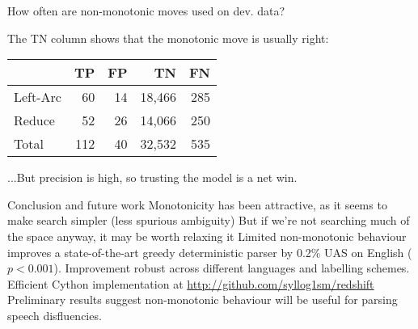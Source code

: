 \documentclass{lecture}
\begin{document}
\begin{plain}{How often are non-monotonic moves used on dev. data?}

The TN column shows that the monotonic move is usually right:

\begin{table}
    \centering
    \small
    \begin{tabular}{l|rrrr}
\hline
         & TP  &  FP & TN     & FN \\
\hline \hline
Left-Arc & 60  & 14  & 18,466 & 285 \\
Reduce   & 52  & 26  & 14,066 & 250  \\
Total    & 112 & 40  & 32,532  & 535 \\
\hline
\end{tabular}
\end{table}

...But precision is high, so trusting the model is a net win.

\end{plain}

\begin{points}{Conclusion and future work}
    \p Monotonicity has been attractive, as it seems to make search simpler
       (less spurious ambiguity)
    \p But if we're not searching much of the space anyway, it may be worth
       relaxing it
       \vspace{0.2in}
    \p Limited non-monotonic behaviour improves a state-of-the-art greedy
    deterministic parser by 0.2\% UAS on English ($p < 0.001$).
    \p Improvement robust across different languages and labelling schemes.
    \p Efficient Cython implementation at \url{http://github.com/syllog1sm/redshift}
    \vspace{0.2in}
    \p Preliminary results suggest non-monotonic behaviour will be useful for
       parsing speech disfluencies.
\end{points}
\end{document}
